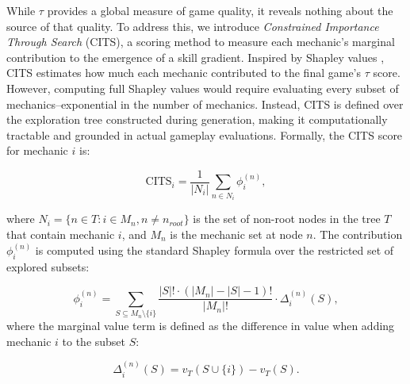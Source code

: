 \documentclass{article} %
\begin{document}

While $\tau$ provides a global measure of game quality, it reveals nothing about the source of that quality. To address this, we introduce \textit{Constrained Importance Through Search} (CITS), a scoring method to measure each mechanic's marginal contribution to the emergence of a skill gradient.
Inspired by Shapley values \cite{shapley1953value}, CITS estimates how much each mechanic contributed to the final game's $\tau$ score. However, computing full Shapley values would require evaluating every subset of mechanics--exponential in the number of mechanics. Instead, CITS is defined over the exploration tree constructed during generation, making it computationally tractable and grounded in actual gameplay evaluations.
Formally, the CITS score for mechanic $i$ is:

\begin{equation*}
\mathrm{CITS}_i = \frac{1}{|N_i|} \sum_{n \in N_i} \phi_i^{(n)}, 
\end{equation*}

where $N_i = \{n \in T : i \in M_n, n \neq n_{root}\}$ is the set of non-root nodes in the tree $T$ that contain mechanic $i$, and $M_n$ is the mechanic set at node $n$. 
The contribution $\phi_i^{(n)}$ is computed using the standard Shapley formula over the restricted set of explored subsets:


\begin{equation*}
\phi_i^{(n)} = \sum_{S \subseteq M_n \setminus \{i\}} \frac{|S|! \cdot (|M_n| - |S| - 1)!}{|M_n|!} \cdot \Delta_i^{(n)}(S),
\end{equation*}
where the marginal value term is defined as the difference in value when adding mechanic \(i\) to the subset \(S\):

\begin{equation*}
\Delta_i^{(n)}(S) = v_T(S \cup \{i\}) - v_T(S).
\end{equation*}
\end{document}
